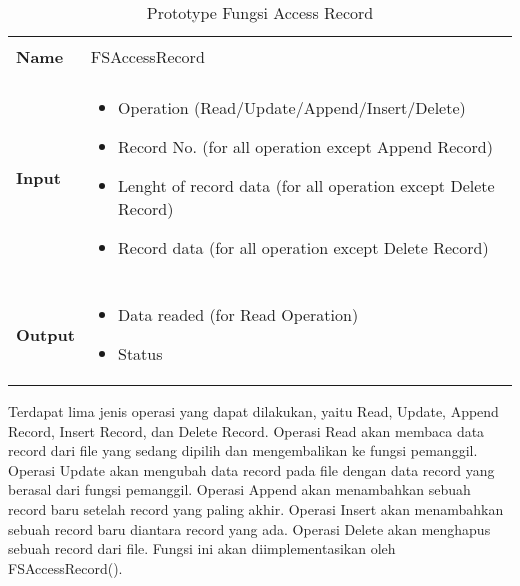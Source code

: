 \documentclass[a4paper, 12pt]{report}
\begin{document}
\begin{table}[h]
  \centering
  \begin{tabular}{p{2cm} p{8cm}}
    \hline\\
    {\bf Name} & FSAccessRecord\\
    \hline\\
    {\bf Input} & 
    \begin{itemize}[noitemsep,topsep=0pt,parsep=0pt,partopsep=0pt]
    \item Operation (Read/Update/Append/Insert/Delete)
    \item Record No. (for all operation except Append Record)
    \item Lenght of record data (for all operation except Delete Record)
    \item Record data (for all operation except Delete Record)
    \end{itemize}
    \\
    \hline\\
    {\bf Output} & 
    \begin{itemize}[noitemsep,topsep=0pt,parsep=0pt,partopsep=0pt]
    \item Data readed (for Read Operation)
    \item Status
    \end{itemize}
    \\
    \hline
  \end{tabular}
  \caption{Prototype Fungsi Access Record}
  \label{tbl-access-record}
\end{table}

Terdapat lima jenis operasi yang dapat dilakukan, yaitu Read, Update, Append Record, Insert Record, dan Delete Record. Operasi Read akan membaca data record dari file yang sedang dipilih dan mengembalikan ke fungsi pemanggil. Operasi Update akan mengubah data record pada file dengan data record yang berasal dari fungsi pemanggil. Operasi Append akan menambahkan sebuah record baru setelah record yang paling akhir. Operasi Insert akan menambahkan sebuah record baru diantara record yang ada. Operasi Delete akan menghapus sebuah record dari file. Fungsi ini akan diimplementasikan oleh FSAccessRecord().
\end{document}
